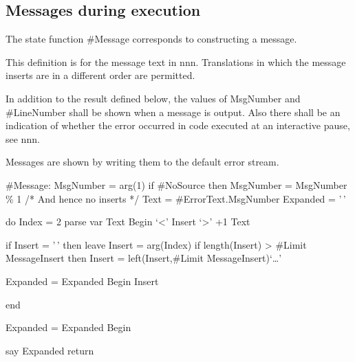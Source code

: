\hypertarget{messages-during-execution}{%
\subsection{Messages during execution}\label{messages-during-execution}}

The state function \#Message corresponds to constructing a message.

This definition is for the message text in nnn. Translations in which
the message inserts are in a different order are permitted.

In addition to the result defined below, the values of MsgNumber and
\#LineNumber shall be shown when a message is output. Also there shall
be an indication of whether the error occurred in code executed at an
interactive pause, see nnn.

Messages are shown by writing them to the default error stream.

\#Message: MsgNumber = arg(1) if \#NoSource then MsgNumber = MsgNumber
\% 1 /* And hence no inserts */ Text = \#ErrorText.MsgNumber Expanded =
'\,'

do Index = 2 parse var Text Begin `\textless{}' Insert `\textgreater{}'
+1 Text

if Insert = '\,' then leave Insert = arg(Index) if length(Insert)
\textgreater{} \#Limit MessageInsert then Insert = left(Insert,\#Limit
MessageInsert)`\ldots{}'

Expanded = Expanded \textbar\textbar{} Begin \textbar\textbar{} Insert

end

Expanded = Expanded \textbar\textbar{} Begin

say Expanded return
